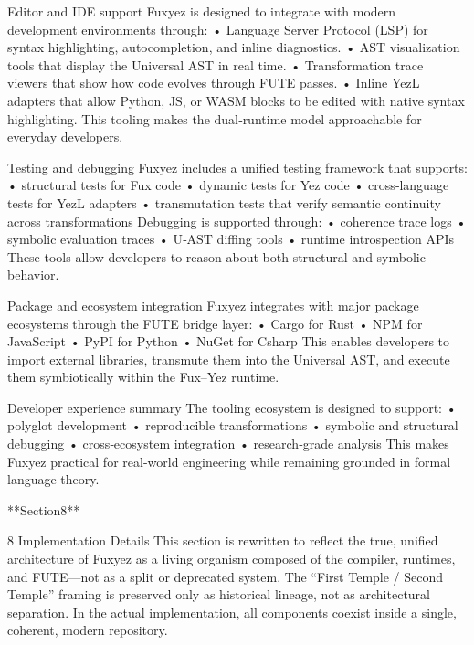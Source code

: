 Editor and IDE support
Fuxyez is designed to integrate with modern development environments through:
• 	Language Server Protocol (LSP) for syntax highlighting, autocompletion, and inline diagnostics.
• 	AST visualization tools that display the Universal AST in real time.
• 	Transformation trace viewers that show how code evolves through FUTE passes.
• 	Inline YezL adapters that allow Python, JS, or WASM blocks to be edited with native syntax highlighting.
This tooling makes the dual‑runtime model approachable for everyday developers.

Testing and debugging
Fuxyez includes a unified testing framework that supports:
• 	structural tests for Fux code
• 	dynamic tests for Yez code
• 	cross‑language tests for YezL adapters
• 	transmutation tests that verify semantic continuity across transformations
Debugging is supported through:
• 	coherence trace logs
• 	symbolic evaluation traces
• 	U‑AST diffing tools
• 	runtime introspection APIs
These tools allow developers to reason about both structural and symbolic behavior.

Package and ecosystem integration
Fuxyez integrates with major package ecosystems through the FUTE bridge layer:
• 	Cargo for Rust
• 	NPM for JavaScript
• 	PyPI for Python
• 	NuGet for Csharp
This enables developers to import external libraries, transmute them into the Universal AST, and execute them symbiotically within the Fux–Yez runtime.

Developer experience summary
The tooling ecosystem is designed to support:
• 	polyglot development
• 	reproducible transformations
• 	symbolic and structural debugging
• 	cross‑ecosystem integration
• 	research‑grade analysis
This makes Fuxyez practical for real-world engineering while remaining grounded in formal language theory.

**Section8**

8 Implementation Details
This section is rewritten to reflect the true, unified architecture of Fuxyez as a living organism composed of the compiler, runtimes, and FUTE—not as a split or deprecated system. The “First Temple / Second Temple” framing is preserved only as historical lineage, not as architectural separation. In the actual implementation, all components coexist inside a single, coherent, modern repository.

